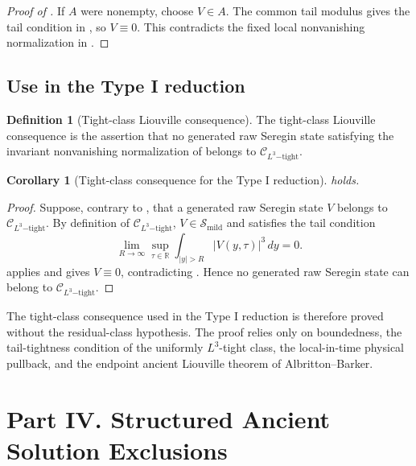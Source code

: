 \documentclass[11pt]{amsart}
\theoremstyle{plain}
\newtheorem{corollary}[corollary]{Corollary}
\theoremstyle{definition}
\newtheorem{definition}[definition]{Definition}
\theoremstyle{remark}
\numberwithin{equation}{section}
\newcommand{\R}{\mathbb R}
\newcommand{\calS}{\mathcal S}
\newcommand{\calC}{\mathcal C}
\begin{document}
\begin{proof}[Proof of ]
If \(A\) were nonempty, choose \(V\in A\).  The common tail modulus gives the
tail condition in , so \(V\equiv0\).  This contradicts
the fixed local nonvanishing normalization in .
\end{proof}

\subsection{Use in the Type I reduction}

\begin{definition}[Tight-class Liouville consequence]
\label{p2:def:tight-class-input}
The tight-class Liouville consequence is the assertion that no generated raw
Seregin state satisfying the invariant nonvanishing normalization of
 belongs to \(\calC_{L^3\mathrm{-tight}}\).
\end{definition}

\begin{corollary}[Tight-class consequence for the Type I reduction]
\label{p2:cor:tight-input-for-paper-I}
 holds.
\end{corollary}

\begin{proof}
Suppose, contrary to , that a generated raw
Seregin state \(V\) belongs to \(\calC_{L^3\mathrm{-tight}}\).  By definition
of \(\calC_{L^3\mathrm{-tight}}\), \(V\in\calS_{\mathrm{mild}}\) and satisfies
the tail condition
\[
   \lim_{R\to\infty}
   \sup_{\tau\in\R}\int_{|y|>R}|V(y,\tau)|^3\,dy=0 .
\]
 applies and gives \(V\equiv0\), contradicting
.  Hence no generated raw Seregin state can
belong to \(\calC_{L^3\mathrm{-tight}}\).
\end{proof}

The tight-class consequence used in the Type I reduction is therefore proved
without the residual-class hypothesis.  The proof relies only on boundedness, the
tail-tightness condition of the uniformly \(L^3\)-tight class, the
local-in-time physical pullback, and the endpoint ancient Liouville theorem of
Albritton--Barker.



\clearpage
\section*{Part IV. Structured Ancient Solution Exclusions}
\end{document}
